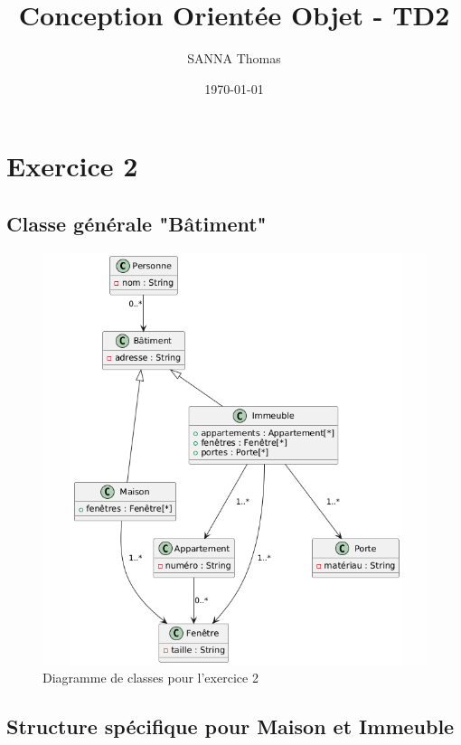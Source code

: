 \documentclass{article}
\begin{document}
\title{Conception Orientée Objet - TD2}
\author{SANNA Thomas}
\date{\today}

\maketitle

\section*{Exercice 2}

\subsection*{Classe générale "Bâtiment"}

\begin{figure}[h]
  \centering
  \includegraphics[width=\textwidth]{exo2-1.png}
  \caption{Diagramme de classes pour l'exercice 2}
\end{figure}

\subsection*{Structure spécifique pour Maison et Immeuble}
\end{document}
